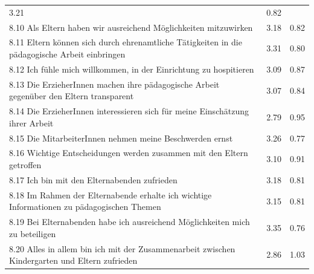 \documentclass[12pt,a4paper]{article}
\begin{document}
\begin{table}[h]
\begin{tabularx}{\textwidth}{Xll}
 3.21&
          0.82\\
8.10 Als Eltern haben wir ausreichend Möglichkeiten mitzuwirken                                                                                                                                                                                                                                                     &
 3.18&
          0.82\\
8.11 Eltern können sich durch ehrenamtliche Tätigkeiten in die
        pädagogische Arbeit einbringen                                                                                                                                                                                            &
 3.31&
          0.80 \\ 
8.12 Ich fühle mich willkommen, in der Einrichtung zu hospitieren   &      
 3.09&
          0.87\\
8.13 Die ErzieherInnen machen ihre pädagogische Arbeit gegenüber
        den Eltern transparent                                                                                                                                                                                                                                            &
 3.07&
          0.84\\
8.14 Die ErzieherInnen interessieren sich für meine Einschätzung
        ihrer Arbeit  &
 2.79&
          0.95\\
8.15 Die MitarbeiterInnen nehmen meine Beschwerden ernst                                                                                                        &
 3.26&
          0.77\\
8.16 Wichtige Entscheidungen werden zusammen mit den Eltern
        getroffen                                                                                                &
 3.10&
          0.91\\
8.17 Ich bin mit den Elternabenden zufrieden                                              &
 3.18&
          0.81\\
8.18 Im Rahmen der Elternabende erhalte ich wichtige    
        Informationen zu pädagogischen Themen                                                                    &
 3.15&
          0.81\\
8.19 Bei Elternabenden habe ich ausreichend Möglichkeiten mich    
        zu beteiligen                                                                                 &
 3.35&
          0.76\\
8.20 Alles in allem bin ich mit der Zusammenarbeit zwischen  
        Kindergarten und Eltern zufrieden&
 2.86&
          1.03\\
\hline 
\end{tabularx} 
\end{table}
\FloatBarrier
\end{document}
